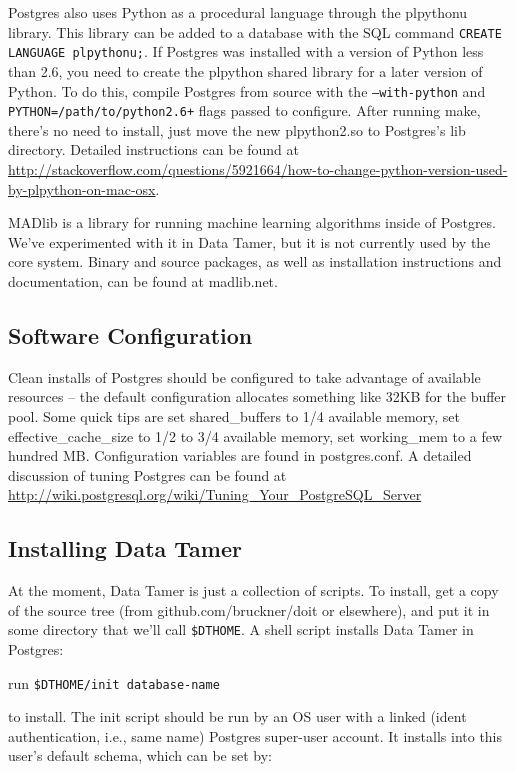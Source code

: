 \documentclass[12pt]{article}
\begin{document}
Postgres also uses Python as a procedural language through the plpythonu library.  This library can be added to a database with the SQL command \texttt{CREATE LANGUAGE plpythonu;}.  If Postgres was installed with a version of Python less than 2.6, you need to create the plpython shared library for a later version of Python.  To do this, compile Postgres from source with the \texttt{--with-python} and \texttt{PYTHON=/path/to/python2.6+} flags passed to configure.  After running make, there's no need to install, just move the new plpython2.so to Postgres's lib directory.  Detailed instructions can be found at \url{http://stackoverflow.com/questions/5921664/how-to-change-python-version-used-by-plpython-on-mac-osx}.

MADlib is a library for running machine learning algorithms inside of Postgres.  We've experimented with it in Data Tamer, but it is not currently used by the core system.  Binary and source packages, as well as installation instructions and documentation, can be found at madlib.net.


\subsection{Software Configuration}

Clean installs of Postgres should be configured to take advantage of available resources -- the default configuration allocates something like 32KB for the buffer pool.  Some quick tips are set shared\_buffers to 1/4 available memory, set effective\_cache\_size to 1/2 to 3/4 available memory, set working\_mem to a few hundred MB.  Configuration variables are found in postgres.conf.  A detailed discussion of tuning Postgres can be found at \url{http://wiki.postgresql.org/wiki/Tuning\_Your\_PostgreSQL\_Server}


\subsection{Installing Data Tamer}

At the moment, Data Tamer is just a collection of scripts.  To install, get a copy of the source tree (from github.com/bruckner/doit or elsewhere), and put it in some directory that we'll call \texttt{\$DTHOME}.  A shell script installs Data Tamer in Postgres:

run \texttt{\$DTHOME/init database-name}

to install.  The init script should be run by an OS user with a linked (ident authentication, i.e., same name) Postgres super-user account.  It installs into this user's default schema, which can be set by:
\end{document}
